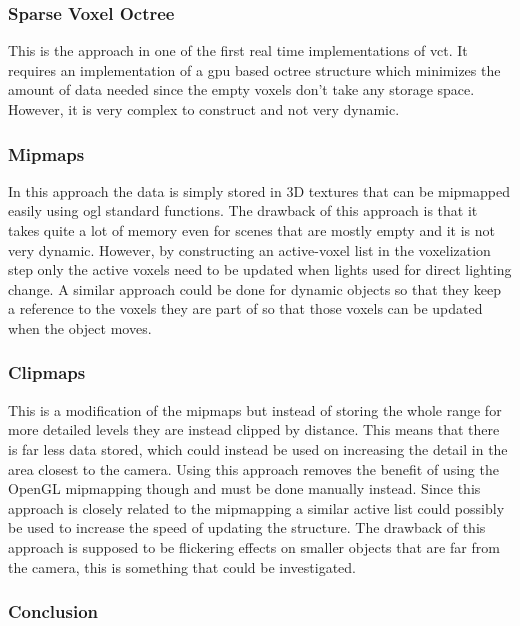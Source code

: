 \documentclass[a4paper, 12pt]{article}
\begin{document}
\subsubsection{Sparse Voxel Octree}

This is the approach in one of the first real time implementations of \gls{vct}. It requires an implementation of a \gls{gpu} based octree structure which minimizes the amount of data needed since the empty voxels don't take any storage space. However, it is very complex to construct and not very dynamic.

\subsubsection{Mipmaps}

In this approach the data is simply stored in 3D textures that can be mipmapped easily using \gls{ogl} standard functions. The drawback of this approach is that it takes quite a lot of memory even for scenes that are mostly empty and it is not very dynamic. However, by constructing an active-voxel list in the voxelization step only the active voxels need to be updated when lights used for direct lighting change. A similar approach could be done for dynamic objects so that they keep a reference to the voxels they are part of so that those voxels can be updated when the object moves.

\subsubsection{Clipmaps}

This is a modification of the mipmaps but instead of storing the whole range for more detailed levels they are instead clipped by distance. This means that there is far less data stored, which could instead be used on increasing the detail in the area closest to the camera. Using this approach removes the benefit of using the OpenGL mipmapping though and must be done manually instead. Since this approach is closely related to the mipmapping a similar active list could possibly be used to increase the speed of updating the structure. The drawback of this approach is supposed to be flickering effects on smaller objects that are far from the camera, this is something that could be investigated.

\subsubsection{Conclusion}
\end{document}

